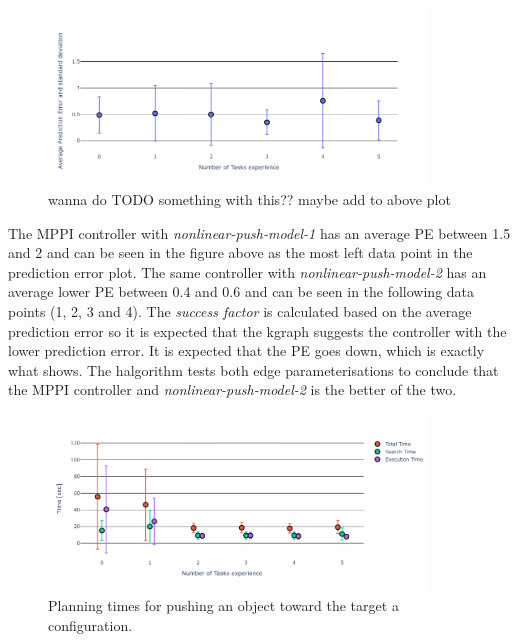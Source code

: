 \begin{figure}[H]
    \centering
    \includegraphics[width=0.9\textwidth]{figures/results/random_pe_push_no_kgraph}
    \caption{wanna do TODO something with this?? maybe add to above plot}%
    \label{fig:rand_push_full_pr}
\end{figure}

The \ac{MPPI} controller with \textit{nonlinear-push-model-1} has an average \ac{PE} between 1.5 and 2 and can be seen in the figure above as the most left data point in the prediction error plot. The same controller with \textit{nonlinear-push-model-2} has an average lower \ac{PE} between 0.4 and 0.6 and can be seen in the following data points (1, 2, 3 and 4). The \textit{success factor}  is calculated based on the average prediction error so it is expected that the \ac{kgraph} suggests the controller with the lower prediction error. It is expected that the \ac{PE} goes down, which is exactly what  shows. The \ac{halgorithm} tests both edge parameterisations to conclude that the \ac{MPPI} controller and \textit{nonlinear-push-model-2} is the better of the two.

\begin{figure}[H]
    \centering
    \includegraphics[width=0.9\textwidth]{figures/results/random_push_kgraph}
    \caption{Planning times for pushing an object toward the target a configuration.}%
    \label{fig:random_push_all_times}
\end{figure}

